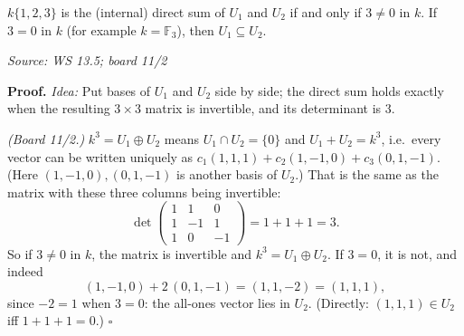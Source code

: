 \documentclass[11pt]{report}
\renewenvironment{proof}[1][Proof]{\noindent\textbf{#1.} }{\hfill$\square$\par\vspace{5pt}}
\newcommand{\srcline}[1]{\par\hfill{\footnotesize\textit{Source: #1}}}
\begin{document}
\begin{propbox}[{When $k\{1,2,3\} = U_1 \oplus U_2$}]\label{prop:k123-direct-sum}
$k\{1,2,3\}$ is the (internal) direct sum of $U_1$ and $U_2$ if and only if $3 \neq 0$ in $k$. If $3 = 0$ in $k$ (for example $k = \mathbb{F}_3$), then $U_1 \subseteq U_2$.
\srcline{WS 13.5; board 11/2}
\end{propbox}

\begin{proof}
\textit{Idea:} Put bases of $U_1$ and $U_2$ side by side; the direct sum holds exactly when the resulting $3 \times 3$ matrix is invertible, and its determinant is $3$.\par
\textit{(Board 11/2.)} $k^3 = U_1 \oplus U_2$ means $U_1 \cap U_2 = \{0\}$ and $U_1 + U_2 = k^3$, i.e.\ every vector can be written uniquely as $c_1(1,1,1) + c_2(1,-1,0) + c_3(0,1,-1)$. (Here $(1,-1,0), (0,1,-1)$ is another basis of $U_2$.) That is the same as the matrix with these three columns being invertible:
\[ \det \begin{pmatrix} 1 & 1 & 0 \\ 1 & -1 & 1 \\ 1 & 0 & -1 \end{pmatrix} = 1 + 1 + 1 = 3. \]
So if $3 \neq 0$ in $k$, the matrix is invertible and $k^3 = U_1 \oplus U_2$. If $3 = 0$, it is not, and indeed
\[ (1,-1,0) + 2\,(0,1,-1) = (1, 1, -2) = (1,1,1), \]
since $-2 = 1$ when $3 = 0$: the all-ones vector lies in $U_2$. (Directly: $(1,1,1) \in U_2$ iff $1 + 1 + 1 = 0$.)
\end{proof}
\end{document}
